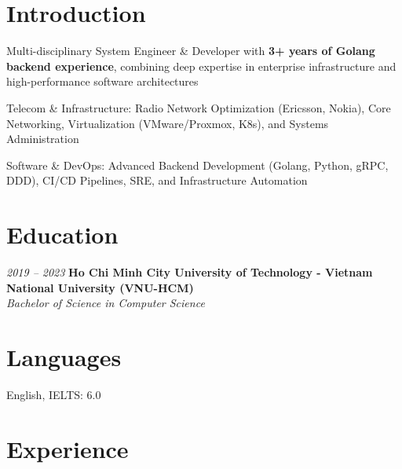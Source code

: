 \section{Introduction}
\begin{onecolentry}
    \begin{highlights}
        \item Multi-disciplinary System Engineer \& Developer with \textbf{3+ years of Golang backend experience}, combining deep expertise in enterprise infrastructure and high-performance software architectures
        \item Telecom \& Infrastructure: Radio Network Optimization (Ericsson, Nokia), Core Networking, Virtualization (VMware/Proxmox, K8s), and Systems Administration
        \item Software \& DevOps: Advanced Backend Development (Golang, Python, gRPC, DDD), CI/CD Pipelines, SRE, and Infrastructure Automation
    \end{highlights}
\end{onecolentry}


\section{Education}
\begin{twocolentry}{\textit{2019 -- 2023}}
    \textbf{Ho Chi Minh City University of Technology - Vietnam National University (VNU-HCM)}\\[4pt]
    \textit{Bachelor of Science in Computer Science}
\end{twocolentry}


\section{Languages}
\begin{onecolentry}
    \begin{highlights}
        \item English, IELTS: 6.0
    \end{highlights}
\end{onecolentry}

\section{Experience}

